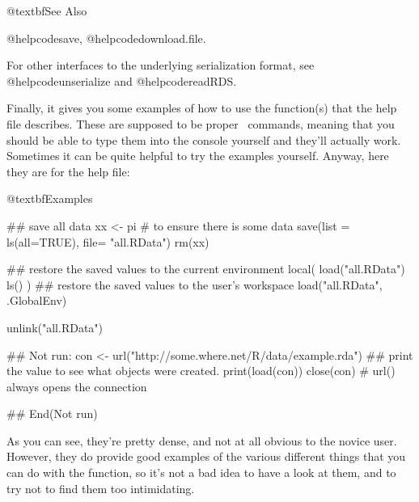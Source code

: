 \begin{rhelp1}
@textbf{See Also}

@helpcode{save}, @helpcode{download.file}.

For other interfaces to the underlying serialization format, see @helpcode{unserialize} and @helpcode{readRDS}.
\end{rhelp1}

\noindent
Finally, it gives you some examples of how to use the function(s) that the help file describes. These are supposed to be proper \R\ commands, meaning that you should be able to type them into the console yourself and they'll actually work. Sometimes it can be quite helpful to try the examples yourself. Anyway, here they are for the  help file:
\begin{rhelp1} 
@textbf{Examples} 
\end{rhelp1}
\vspace*{-24pt}
\begin{rhelp2}

## save all data
xx <- pi # to ensure there is some data
save(list = ls(all=TRUE), file= "all.RData")
rm(xx)

## restore the saved values to the current environment
local({
   load("all.RData")
   ls()
})
## restore the saved values to the user's workspace
load("all.RData", .GlobalEnv)

unlink("all.RData")

## Not run: 
con <- url("http://some.where.net/R/data/example.rda")
## print the value to see what objects were created.
print(load(con))
close(con) # url() always opens the connection

## End(Not run)
\end{rhelp2}
As you can see, they're pretty dense, and not at all obvious to the novice user. However, they do provide good examples of the various different things that you can do with the  function, so it's not a bad idea to have a look at them, and to try not to find them too intimidating. 



